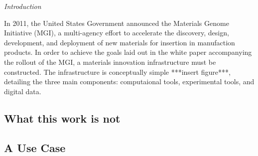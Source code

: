 \textit{Introduction}

In 2011, the United States Government announced the Materials Genome
Initiative (MGI), a multi-agency effort to accelerate the discovery, design,
development, and deployment of new materials for insertion in
manufaction products.    In order to achieve the goals laid out in the white paper
 \cite{mgiwhitepaper} accompanying the rollout of the MGI, a materials
innovation infrastructure must be constructed.  The infrastructure is
conceptually simple ***insert figure***, detailing the three main
components: computaional tools, experimental tools, and digital data.   

\subsection{What this work is not}


\subsection{A Use Case}

